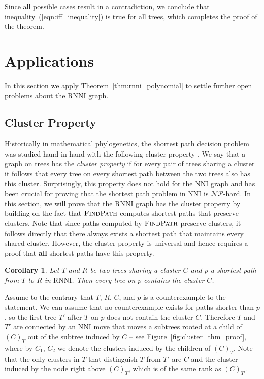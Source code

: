 \documentclass[11pt]{amsart}
\newtheorem{corollary}{Corollary}
\newcommand{\rnni}{\mathrm{RNNI}}
\newcommand{\findpath}{\textsc{FindPath}}
\newcommand{\nni}{\mathrm{NNI}}
\newcommand{\np}{\mathcal{NP}}
\newcommand{\summary}[1]{} %
\begin{document}
Since all possible cases result in a contradiction, we conclude that inequality~(\ref{eqn:iff_inequality}) is true for all trees, which completes the proof of the theorem.
\endproof


\section{Applications}

In this section we apply Theorem~\ref{thm:rnni_polynomial} to settle further open problems about the $\rnni$ graph.

\subsection{Cluster Property}

\summary{Some words on the cluster property}
Historically in mathematical phylogenetics, the shortest path decision problem was studied hand in hand with the following cluster property \autocite{Dasgupta2000-xa}.
We say that a graph on trees has the \emph{cluster property} if for every pair of trees sharing a cluster it follows that every tree on every shortest path between the two trees also has this cluster.
Surprisingly, this property does not hold for the $\nni$ graph \autocite{Li1996-zw} and has been crucial for proving \autocite{Dasgupta2000-xa} that the shortest path problem in $\nni$ is $\np$-hard.
In this section, we will prove that the $\rnni$ graph has the cluster property by building on the fact that $\findpath$ computes shortest paths that preserve clusters.
Note that since paths computed by $\findpath$ preserve clusters, it follows directly that there always exists a shortest path that maintains every shared cluster.
However, the cluster property is universal and hence requires a proof that \textbf{all} shortest paths have this property.

\summary{Proving the Cluster Property for $\rnni$}

\begin{corollary}
Let $T$ and $R$ be two trees sharing a cluster $C$ and $p$ a shortest path from $T$ to $R$ in $\rnni$.
Then every tree on $p$ contains the cluster $C$.
\label{cluster_thm}
\end{corollary}

\proof
Assume to the contrary that $T$, $R$, $C$, and $p$ is a counterexample to the statement.
We can assume that no counterexample exists for paths shorter than $p$, so the first tree $T'$ after $T$ on $p$ does not contain the cluster $C$.
Therefore $T$ and $T'$ are connected by an $\nni$ move that moves a subtrees rooted at a child of $(C)_T$ out of the subtree induced by $C$ -- see Figure~\ref{fig:cluster_thm_proof}, where by $C_1$, $C_2$ we denote the clusters induced by the children of $(C)_T$.
Note that the only clusters in $T$ that distinguish $T$ from $T'$ are $C$ and the cluster induced by the node right above $(C)_{T}$, which is of the same rank as $(C)_{T'}$.
\end{document}
